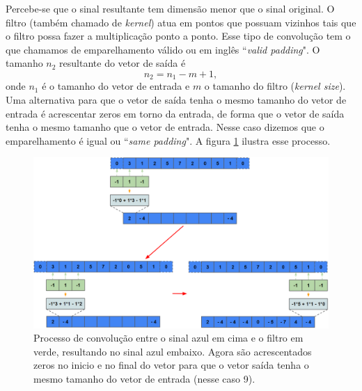 \documentclass[a4paper,12pt,oneside]{book}
\begin{document}
\par Percebe-se que o sinal resultante tem dimensão menor que o sinal original. O filtro (também chamado de \textit{kernel}) atua em pontos que possuam vizinhos tais que o filtro possa fazer a multiplicação ponto a ponto. Esse tipo de convolução tem o que chamamos de emparelhamento válido ou em inglês ``\textit{valid padding}". O tamanho $n_2$ resultante do vetor de saída é 
\begin{equation}
    n_2 = n_1 - m + 1,
\end{equation}
%
onde $n_1$ é o tamanho do vetor de entrada e $m$ o tamanho do filtro (\textit{kernel size}). Uma alternativa para que o vetor de saída tenha o mesmo tamanho do vetor de entrada é acrescentar zeros em torno da entrada, de forma que o vetor de saída tenha o mesmo tamanho que o vetor de entrada. Nesse caso dizemos que o emparelhamento é igual ou ``\textit{same padding}". A figura \ref{fig:conv_same} ilustra esse processo.

\begin{figure}[H]
    \centering
    \includegraphics[scale = 0.38]{figs/conv_same.png}
    \caption{Processo de convolução entre o sinal azul em cima e o filtro em verde, resultando no sinal azul embaixo. Agora são acrescentados zeros no inicio e no final do vetor para que o vetor saída tenha o mesmo tamanho do vetor de entrada (nesse caso 9).}
    \label{fig:conv_same}
\end{figure}

\end{document}
